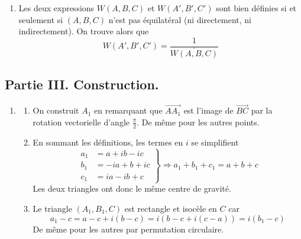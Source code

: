 \begin{enumerate}
 \item Les deux expressions $W(A,B,C)$ et $W(A',B',C')$ sont bien définies si et seulement si $(A,B,C)$ n'est pas équilatéral (ni directement, ni indirectement). On trouve alors que
\begin{displaymath}
 W(A',B',C') = \frac{1}{\bar{W(A,B,C)}}
\end{displaymath}
\end{enumerate}

\subsection*{Partie III. Construction.}
\begin{enumerate}
 \item 
\begin{enumerate}
 \item On construit $A_1$ en remarquant que $\overrightarrow{AA_1}$ est l'image de $\overrightarrow{BC}$ par la rotation vectorielle d'angle $\frac{\pi}{2}$. De même pour les autres points.
 \item En sommant les définitions, les termes en $i$ se simplifient
\begin{displaymath}
 \left. 
\begin{aligned}
 a_1 &= a +ib -ic \\ b_1 &= -ia +b +ic \\ c_1 &= ia -ib +c 
\end{aligned}
\right\rbrace 
\Rightarrow
a_1+b_1+c_1 = a+b+c
\end{displaymath}
Les deux triangles ont donc le même centre de gravité.
 \item Le triangle $(A_1,B_1,C)$ est rectangle et isocèle en $C$ car
\begin{displaymath}
 a_1-c = a-c +i(b-c) = i\left( b-c +i(c-a)\right) = i(b_1-c) 
\end{displaymath}
De même pour les autres par permutation circulaire.
\end{enumerate}


\end{enumerate}
